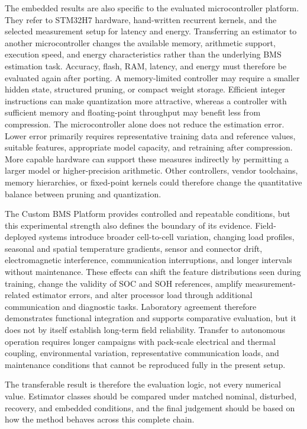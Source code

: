 \documentclass[
    a4paper,
    12pt,
    titlepage,
    bibliography=totoc,
    twoside=on,
    parskip=false,
    numbers=noenddot,
    cleardoublepage=empty,
    DIV=12,
    BCOR=12.0mm,
    headheight=36pt,
    headings=openright
]{scrreprt}
\begin{document}
The embedded results are also specific to the evaluated microcontroller platform. They refer to STM32H7 hardware, hand-written recurrent kernels, and the selected measurement setup for latency and energy. Transferring an estimator to another microcontroller changes the available memory, arithmetic support, execution speed, and energy characteristics rather than the underlying BMS estimation task. Accuracy, flash, RAM, latency, and energy must therefore be evaluated again after porting. A memory-limited controller may require a smaller hidden state, structured pruning, or compact weight storage. Efficient integer instructions can make quantization more attractive, whereas a controller with sufficient memory and floating-point throughput may benefit less from compression. The microcontroller alone does not reduce the estimation error. Lower error primarily requires representative training data and reference values, suitable features, appropriate model capacity, and retraining after compression. More capable hardware can support these measures indirectly by permitting a larger model or higher-precision arithmetic. Other controllers, vendor toolchains, memory hierarchies, or fixed-point kernels could therefore change the quantitative balance between pruning and quantization.

The Custom BMS Platform provides controlled and repeatable conditions, but this experimental strength also defines the boundary of its evidence. Field-deployed systems introduce broader cell-to-cell variation, changing load profiles, seasonal and spatial temperature gradients, sensor and connector drift, electromagnetic interference, communication interruptions, and longer intervals without maintenance. These effects can shift the feature distributions seen during training, change the validity of SOC and SOH references, amplify measurement-related estimator errors, and alter processor load through additional communication and diagnostic tasks. Laboratory agreement therefore demonstrates functional integration and supports comparative evaluation, but it does not by itself establish long-term field reliability. Transfer to autonomous operation requires longer campaigns with pack-scale electrical and thermal coupling, environmental variation, representative communication loads, and maintenance conditions that cannot be reproduced fully in the present setup.

The transferable result is therefore the evaluation logic, not every numerical value. Estimator classes should be compared under matched nominal, disturbed, recovery, and embedded conditions, and the final judgement should be based on how the method behaves across this complete chain.
\end{document}
